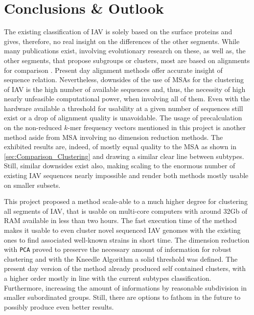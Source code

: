\chapter{Conclusions \& Outlook} \label{chap:Conclusion}

The existing classification of \gls{IAV} is solely based on the surface proteins and gives, therefore, no real insight on the differences of the other segments. While many publications exist, involving evolutionary research on these, as well as, the other segments, that propose subgroups or clusters, most are based on alignments for comparison \autocite{suarez_evolution_2000, nelson_multiple_2008, whooiefao_h5n1_evolution_working_group_continued_2012}. Present day alignment methods offer accurate insight of sequence relation. Nevertheless, downsides of the use of \glspl{MSA} for the clustering of \gls{IAV} is the high number of available sequences and, thus, the necessity of high nearly unfeasible computational power, when involving all of them. Even with the hardware available a threshold for usability at a given number of sequences still exist or a drop of alignment quality is unavoidable. The usage of precalculation on the non-reduced $k$-mer frequency vectors mentioned in this project is another method aside from \gls{MSA} involving no dimension reduction methods. The exhibited results are, indeed, of mostly equal quality to the \gls{MSA} as shown in \autoref{sec:Comparison_Clustering} and drawing a similar clear line between subtypes. Still, similar downsides exist also, making scaling to the enormous number of existing \gls{IAV} sequences nearly impossible and render both methods mostly usable on smaller subsets.

\vspace{1em}

This project proposed a method scale-able to a much higher degree for clustering all segments of \gls{IAV}, that is usable on multi-core computers with around 32Gb of RAM available in less than two hours. The fast execution time of the method makes it usable to even cluster novel sequenced \gls{IAV} genomes with the existing ones to find associated well-known strains in short time. The dimension reduction with \texttt{PCA} proved to preserve the necessary amount of information for robust clustering and with the Kneedle Algorithm a solid threshold was defined. The present day version of the method already produced self contained clusters, with a higher order mostly in line with the current subtypes classification. Furthermore, increasing the amount of informations by reasonable subdivision in smaller subordinated groups. Still, there are options to fathom in the future to possibly produce even better results. 

